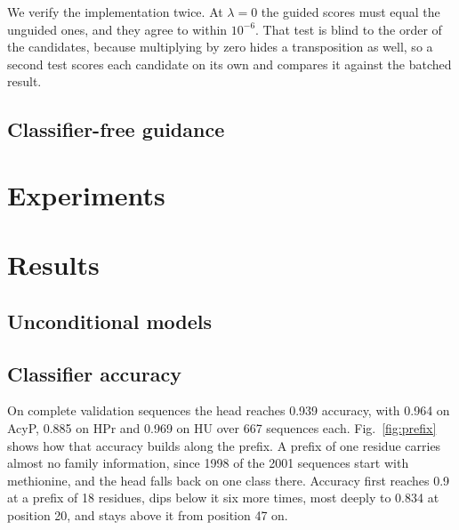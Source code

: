 \documentclass{article}
\begin{document}
We verify the implementation twice.
At $\lambda = 0$ the guided scores must equal the unguided ones, and they agree to within $10^{-6}$.
That test is blind to the order of the candidates, because multiplying by zero hides a transposition as well, so a second test scores each candidate on its own and compares it against the batched result.

\subsection{Classifier-free guidance}
\label{ssec:cfg}


\section{Experiments}
\label{sec:experiments}


\section{Results}
\label{sec:results}

\subsection{Unconditional models}
\label{ssec:unconditional}


\subsection{Classifier accuracy}
\label{ssec:accuracy}

On complete validation sequences the head reaches 0.939 accuracy, with 0.964 on AcyP, 0.885 on HPr and 0.969 on HU over 667 sequences each.
Fig.~\ref{fig:prefix} shows how that accuracy builds along the prefix.
A prefix of one residue carries almost no family information, since 1998 of the 2001 sequences start with methionine, and the head falls back on one class there.
Accuracy first reaches 0.9 at a prefix of 18 residues, dips below it six more times, most deeply to 0.834 at position 20, and stays above it from position 47 on.
\end{document}
